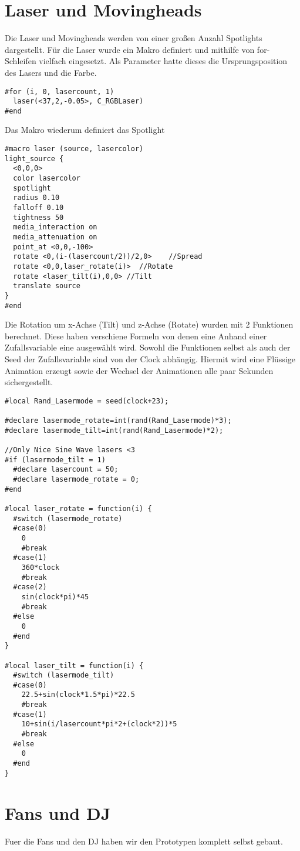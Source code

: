 \documentclass[paper=a4]{scrartcl}
\begin{document}
\section{Laser und Movingheads}
Die Laser und Movingheads werden von einer großen Anzahl Spotlights dargestellt.
Für die Laser wurde ein Makro definiert und mithilfe von for-Schleifen vielfach eingesetzt.
Als Parameter hatte dieses die Ursprungsposition des Lasers und die Farbe.
\begin{lstlisting}
#for (i, 0, lasercount, 1)
  laser(<37,2,-0.05>, C_RGBLaser)
#end

\end{lstlisting}
Das Makro wiederum definiert das Spotlight
\begin{lstlisting}
#macro laser (source, lasercolor)
light_source {
  <0,0,0>
  color lasercolor
  spotlight
  radius 0.10
  falloff 0.10
  tightness 50
  media_interaction on
  media_attenuation on
  point_at <0,0,-100>
  rotate <0,(i-(lasercount/2))/2,0>    //Spread
  rotate <0,0,laser_rotate(i)>  //Rotate
  rotate <laser_tilt(i),0,0> //Tilt
  translate source
}
#end
\end{lstlisting}
Die Rotation um x-Achse (Tilt) und z-Achse (Rotate) wurden mit 2 Funktionen berechnet.
Diese haben verschiene Formeln von denen eine Anhand einer Zufallsvariable eine ausgewählt wird. Sowohl die Funktionen selbst als auch der Seed der Zufallsvariable sind von der Clock abhängig. Hiermit wird eine Flüssige Animation erzeugt sowie der Wechsel der Animationen alle paar Sekunden sichergestellt.
\begin{lstlisting}
#local Rand_Lasermode = seed(clock+23);

#declare lasermode_rotate=int(rand(Rand_Lasermode)*3);
#declare lasermode_tilt=int(rand(Rand_Lasermode)*2);

//Only Nice Sine Wave lasers <3
#if (lasermode_tilt = 1)
  #declare lasercount = 50;
  #declare lasermode_rotate = 0;
#end

#local laser_rotate = function(i) {
  #switch (lasermode_rotate)
  #case(0)
    0
    #break
  #case(1)
    360*clock
    #break
  #case(2)
    sin(clock*pi)*45
    #break
  #else
    0
  #end
}

#local laser_tilt = function(i) {
  #switch (lasermode_tilt)
  #case(0)
    22.5+sin(clock*1.5*pi)*22.5
    #break
  #case(1)
    10+sin(i/lasercount*pi*2+(clock*2))*5
    #break
  #else
    0
  #end
}

\end{lstlisting}

\section{Fans und DJ}
Fuer die Fans und den DJ haben wir den Prototypen komplett selbst gebaut.
\end{document}
